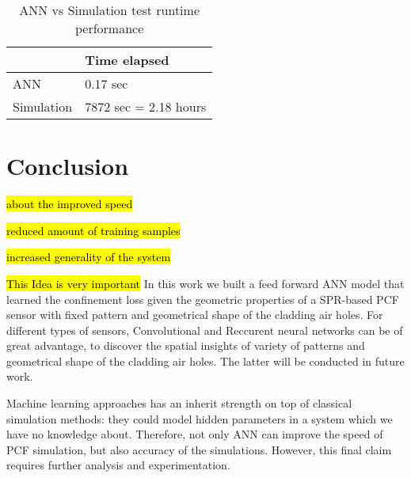 \documentclass[draft, 10pt]{IEEEtran}
\begin{document}
\begin{table}[h]
\centering
\begin{tabular}{l|l}
      & Time elapsed \\
      \hline
    ANN &  0.17 sec \\
    \hline
    Simulation &  7872 sec = 2.18 hours  \\
\end{tabular}

\caption{ANN vs Simulation test runtime performance}
\end{table}
\newpage

\section{Conclusion}
\label{sec:conc}

\hl{about the improved speed}

\hl{reduced amount of training samples}

\hl{increased generality of the system}

\hl{This Idea is very important}
In this work we built a feed forward ANN model that learned the confinement loss given the geometric properties of a SPR-based PCF sensor with fixed pattern and geometrical shape of the cladding air holes. For different types of sensors, Convolutional and Reccurent neural networks can be of great advantage, to discover the spatial insights of variety of patterns and  geometrical shape of the cladding air holes. The latter will be conducted in future work.

Machine learning approaches has an inherit strength on top of classical simulation methods: they could model hidden parameters in a system which we have no knowledge about. Therefore, not only ANN can improve the speed of PCF simulation, but also accuracy of the simulations. However, this final claim requires further analysis and experimentation.


	
\end{document}
